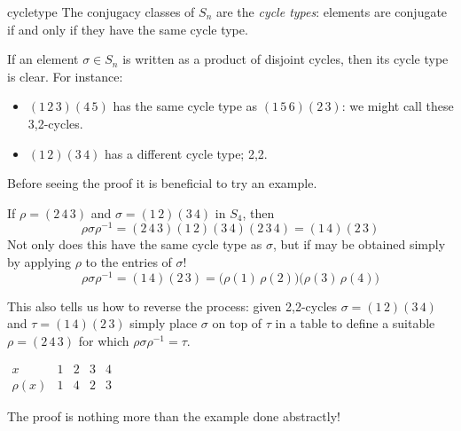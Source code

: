 \begin{thm}{}{cycletype}
The conjugacy classes of $S_n$ are the \emph{cycle types}: elements are conjugate if and only if they have the same cycle type.
\end{thm}

If an element $\sigma\in S_n$ is written as a product of disjoint cycles, then its cycle type is clear. For instance:
\begin{itemize}
  \item $(1\,2\,3)(4\,5)$ has the same cycle type as $(1\,5\,6)(2\,3)$: we might call these 3,2-cycles.
  \item $(1\,2)(3\,4)$ has a different cycle type; 2,2.
\end{itemize}

\goodbreak

Before seeing the proof it is beneficial to try an example.

\begin{example}{}{}
If $\rho=(2\,4\,3)$ and $\sigma=(1\,2)(3\,4)$ in $S_4$, then
  \[
  \rho\sigma\rho^{-1}=(2\,4\,3)(1\,2)(3\,4)(2\,3\,4)=(1\,4)(2\,3)
  \]
  Not only does this have the same cycle type as $\sigma$, but if may be obtained simply by applying $\rho$ to the entries of $\sigma$!
  \[\rho\sigma\rho^{-1}=(1\,4)(2\,3) =\bigl(\rho(1)\,\rho(2)\bigr)\bigl(\rho(3)\,\rho(4)\bigr)\]
  \begin{minipage}[t]{0.75\linewidth}\vspace{-5pt}
  This also tells us how to reverse the process: given 2,2-cycles $\sigma=(1\,2)(3\,4)$ and $\tau=(1\,4)(2\,3)$ simply place $\sigma$ on top of $\tau$ in a table to define a suitable $\rho=(2\,4\,3)$ for which $\rho\sigma\rho^{-1}=\tau$.
  \end{minipage}\hfill\begin{minipage}[t]{0.2\linewidth}\vspace{-5pt}
    $\begin{array}{l|cccc}
  x&1&2&3&4\\\hline
  \rho(x)&1&4&2&3
  \end{array}$
  \end{minipage}
\end{example}

The proof is nothing more than the example done abstractly!


